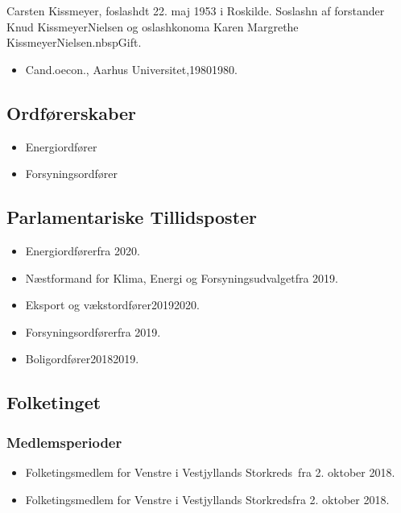 \documentclass[11pt, a4paper]{awesome-cv}
\begin{document}
\makecvheader[R]
\makelettertitle
\begin{cvletter}
Carsten Kissmeyer, foslashdt 22. maj 1953 i Roskilde. Soslashn af forstander Knud KissmeyerNielsen og oslashkonoma Karen Margrethe KissmeyerNielsen.nbspGift.

\begin{itemize}
\item Cand.oecon., Aarhus Universitet,19801980.
\end{itemize}
\subsection*{Ordførerskaber}
\begin{itemize}
\item Energiordfører
\item Forsyningsordfører
\end{itemize}
\subsection*{Parlamentariske Tillidsposter}
\begin{itemize}
\item Energiordførerfra 2020.
\item Næstformand for Klima, Energi og Forsyningsudvalgetfra 2019.
\item Eksport og vækstordfører20192020.
\item Forsyningsordførerfra 2019.
\item Boligordfører20182019.
\end{itemize}
\subsection*{Folketinget}
\subsubsection*{Medlemsperioder}
\begin{itemize}
\item Folketingsmedlem for Venstre i Vestjyllands Storkreds fra 2. oktober 2018.
\item Folketingsmedlem for Venstre i Vestjyllands Storkredsfra 2. oktober 2018.
\end{itemize}

\end{cvletter}
\end{document}

